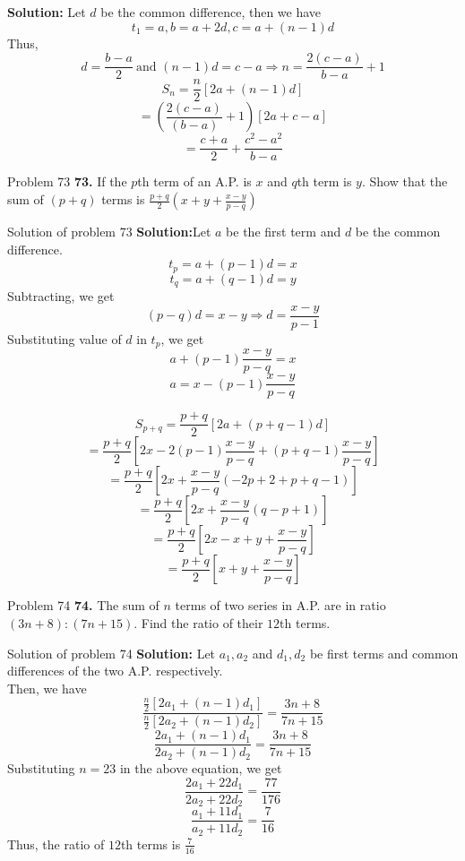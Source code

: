 \documentclass[aspectratio=169,8pt]{beamer}
\begin{document}
\begin{frame}
  \textbf{Solution:} Let $d$ be the common difference, then we have
  $$t_1 = a, b = a + 2d, c = a + (n - 1)d$$
  Thus, $$d = \frac{b - a}{2}~\text{and~} (n - 1)d = c - a \Rightarrow n = \frac{2(c -
    a)}{b - a} + 1$$
  $$S_n = \frac{n}{2}[2a + (n - 1)d]$$
  $$= \left(\frac{2(c - a)}{(b - a)} + 1\right)[2a + c - a]$$
  $$= \frac{c + a}{2} + \frac{c^2 - a^2}{b - a}$$
\end{frame}
\begin{frame}{Problem 73}
  \textbf{73.} If the $p$th term of an A.P. is $x$ and $q$th term is $y$. Show
  that the sum of $(p + q)$ terms is $\frac{p + q}{2}\left(x + y + \frac{x -
      y}{p - q}\right)$
\end{frame}
\begin{frame}{Solution of problem 73}
  \textbf{Solution:}Let $a$ be the first term and $d$ be the common difference.
  $$t_p = a + (p - 1)d = x$$
  $$t_q = a + (q - 1)d = y$$
  Subtracting, we get
  $$(p - q)d = x - y\Rightarrow d = \frac{x - y}{p - 1}$$
  Substituting value of $d$ in $t_p$, we get $$a + (p - 1)\frac{x - y}{p -q} =
  x$$
  $$ a = x - (p - 1)\frac{x - y}{p - q}$$

  $$S_{p + q} = \frac{p+q}{2}[2a + (p + q - 1)d]$$
  $$=\frac{p + q}{2}\left[2x - 2(p - 1)\frac{x - y}{p - q} + (p + q - 1)\frac{x
      - y}{p -q}\right]$$
  $$= \frac{p + q}{2}\left[2x + \frac{x- y}{p -q}(-2p + 2 + p + q - 1)\right]$$
  $$= \frac{p + q}{2}\left[2x + \frac{x - y}{p - q}(q - p + 1)\right]$$
  $$= \frac{p + q}{2}\left[2x - x + y + \frac{x - y}{p -q}\right]$$
  $$= \frac{p  + q}{2}\left[x + y + \frac{x - y}{p - q}\right]$$
\end{frame}
\begin{frame}{Problem 74}
  \textbf{74.} The sum of $n$ terms of two series in A.P. are in ratio $(3n +
  8):(7n + 15)$. Find the ratio of their $12$th terms.
\end{frame}
\begin{frame}{Solution of problem 74}
  \textbf{Solution:} Let $a_1, a_2$ and $d_1, d_2$ be first terms and common
  differences of the two A.P. respectively.\\
  Then, we have
  $$\frac{\frac{n}{2}[2a_1 + (n - 1)d_1]}{\frac{n}{2}[2a_2 + (n - 1)d_2]} =
  \frac{3n + 8}{7n + 15}$$
  $$\frac{2a_1 + (n - 1)d_1}{2a_2 + (n - 1)d_2} = \frac{3n + 8}{7n + 15}$$
  Substituting $n = 23$ in the above equation, we get
  $$\frac{2a_1 + 22d_1}{2a_2 + 22d_2} = \frac{77}{176}$$
  $$\frac{a_1 + 11d_1}{a_2 + 11d_2} = \frac{7}{16}$$
  Thus, the ratio of $12$th terms is $\frac{7}{16}$
\end{frame}
\end{document}
